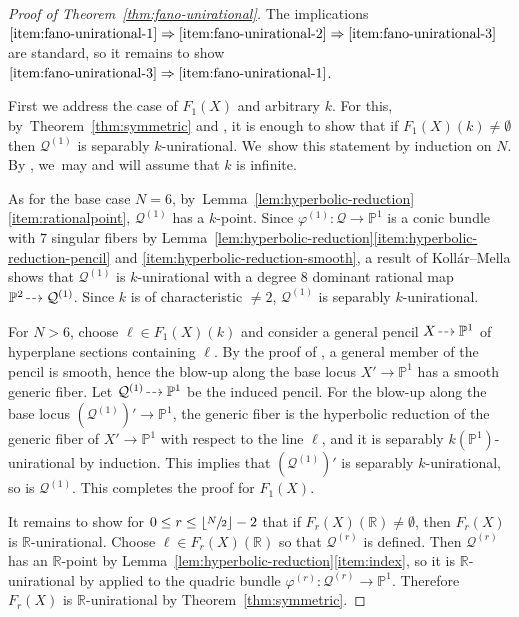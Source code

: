 \documentclass[JEP,XML,SOM,Unicode,NoEqCountersInSection,published]{cedram}
\newcommand{\dradpl}{{\hspace*{-2.5mm}\begin{tikzcd}[ampersand replacement=\&,column sep = scriptsize]\mbox{}\ar[r,dashed]\&\mbox{}\end{tikzcd}\hspace*{-2.5mm}}}
\newcommand{\dratst}{{\hspace*{-2.5mm}\begin{tikzcd}[ampersand replacement=\&,column sep = small]\mbox{}\ar[r,dashed]\&\mbox{}\end{tikzcd}\hspace*{-2mm}}}
\let\drascst\dratst
\newcommand{\dra}{\mathchoice{\dradpl}{\dratst}{\drascst}{\drascst}}
\let \dashrightarrow\dra
\let\bb\mathbb\let\Bbb\mathbb
\theoremstyle{plain}
\theoremstyle{definition}
\let\phi\varphi
\renewcommand\P{\mathbb{P}}
\newcommand\R{\mathbb{R}}
\begin{document}
\begin{proof}[Proof of Theorem~\ref{thm:fano-unirational}]
The implications \(\eqref{item:fano-unirational-1}\Rightarrow\eqref{item:fano-unirational-2}\Rightarrow\eqref{item:fano-unirational-3}\) are standard, so it remains to show \(\eqref{item:fano-unirational-3}\Rightarrow\eqref{item:fano-unirational-1}\).

First we address the case of \(F_1(X)\) and arbitrary \(k\).
For this, by~Theorem~\ref{thm:symmetric} and \cite{Mattuck69},
it is enough to show that
if $F_1(X)(k)\neq\emptyset$ then $\mathcal{Q}^{(1)}$ is separably $k$\nobreakdash-unirational. We~show this statement by induction on $N$.
By \cite[Lem.\,4.9]{BW-IJ}, we~may and will assume that $k$ is infinite.

As for the base case $N\!=\!6$, by~Lemma~\ref{lem:hyperbolic-reduction}\eqref{item:rationalpoint}, $\mathcal{Q}^{(1)}$ has a $k$\nobreakdash-point.
Since $\phi^{(1)}\colon \mathcal{Q}\!\to\! \P^1$ is a conic bundle with $7$ singular fibers by Lemma~\ref{lem:hyperbolic-reduction}\eqref{item:hyperbolic-reduction-pencil} and \eqref{item:hyperbolic-reduction-smooth},
a result of Kollár--Mella \cite[Th.\,7]{kollarmella17} shows that $\mathcal{Q}^{(1)}$ is $k$\nobreakdash-unirational with a degree $8$ dominant rational map $\P^2\dashrightarrow \mathcal{Q}^{(1)}$.
Since $k$ is of characteristic $\neq 2$, $\mathcal{Q}^{(1)}$ is separably $k$\nobreakdash-unirational.

For $N>6$, choose $\ell\in F_1(X)(k)$ and consider a general pencil $X\dashrightarrow \P^1$ of hyperplane sections containing $\ell$.
By the proof of \cite[Lem.\,A.4]{CT-intersection-quadrics},
a general member of the pencil is smooth,
hence
the blow-up along the base locus
$X'\to \P^1$ has a smooth generic fiber.
Let $\mathcal{Q}^{(1)}\dashrightarrow \P^1$ be the induced pencil.
For the blow-up along the base locus
$(\mathcal{Q}^{(1)})'\to \P^1$, the generic fiber is the hyperbolic reduction of the generic fiber of $X'\to \P^1$
with respect to the line $\ell$, and it is separably $k(\P^1)$-unirational by induction.
This implies that $(\mathcal{Q}^{(1)})'$ is separably $k$\nobreakdash-unirational, so is $\mathcal{Q}^{(1)}$.
This completes the proof for \(F_1(X)\).

It remains to show for \(0\leq r\leq \lfloor\sfrac{N}{2}\rfloor -2\) that if \(F_r(X)(\bb R)\neq\emptyset\), then \(F_r(X)\) is \(\bb R\)-unirational.
Choose $\ell\in F_r(X)(\R)$ so that $\mathcal{Q}^{(r)}$ is defined.
Then $\mathcal{Q}^{(r)}$ has an $\R$-point by Lemma~\ref{lem:hyperbolic-reduction}\eqref{item:index}, so it is $\R$-unirational by \cite[Cor.\,1.8]{kollar1999} applied to the quadric bundle $\phi^{(r)}\colon \mathcal{Q}^{(r)}\to \P^1$.
Therefore $F_r(X)$ is $\R$-unirational by Theorem~\ref{thm:symmetric}.
\end{proof}
\end{document}
